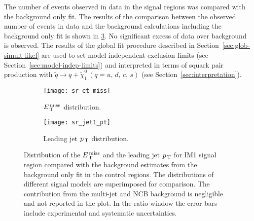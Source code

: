 The number of events observed in data in the signal regions was compared with
the background only fit. The results of the comparison between the observed
number of events in data and the background calculations including the
background only fit is shown in \cref{fig:sr_plots}. No significant excess of
data over background is observed. The results of the global fit procedure
described in Section~\ref{sec:glob-simult-likel} are used to set model
independent exclusion limits (see Section~\ref{sec:model-indep-limits}) and
interpreted in terms of squark pair production with
$\widetilde{q} \rightarrow q + \widetilde{\chi}_1^0\, (q = u,\, d,\, c,\, s)$
(see Section~\ref{sec:interpretation}).
\begin{figure}[!th]
  \centering
  \begin{subfigure}[t]{.48\linewidth}
    \texttt{[image: sr\_et\_miss]}
    \caption{$E_\mathrm{\, T}^\mathrm{\, miss}$ distribution.}
    \label{fig:sr_et_miss}
  \end{subfigure}
  \begin{subfigure}[t]{.48\linewidth}
    \texttt{[image: sr\_jet1\_pt]}
    \caption{Leading jet $p_\mathrm{\, T}$ distribution.}
    \label{fig:sr_jet1_pt}
  \end{subfigure}
  \caption{Distribution of the $E_\mathrm{\, T}^\mathrm{\, miss}$ and the leading jet $p_\mathrm{\, T}$ for IM1 signal
    region compared with the background estimates from the background only fit
    in the control regions. The distributions of different signal models are
    superimposed for comparison. The contribution from the multi-jet and NCB
    background is negligible and not reported in the plot. In the ratio window
    the error bars include experimental and systematic uncertainties.}
  \label{fig:sr_plots}
\end{figure}
